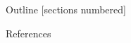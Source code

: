 \documentclass[10pt, aspectratio=169]{beamer}
\begin{document}
\begin{frame}[plain]
\maketitle
\end{frame}

\begin{frame}[plain]{Outline}
  [sections numbered]
  \tableofcontents[hideallsubsections]
\end{frame}

%



\appendix
\begin{frame}[%
			  plain,
			  shrink=10]{References}
\nocite{*}
\printbibliography
\end{frame}
\end{document}
